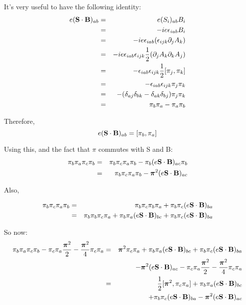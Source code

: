It's very useful to have the following identity:
\begin{eqnarray*}
	e(\mathbf{S} \cdot \mathbf{B})_{ab}
	&=&	e(S_i)_{ab} B_i	\\
	&=&	-i e \epsilon_{iab} B_i 	\\
	&=&	-i e \epsilon_{iab} (\epsilon_{ijk}\partial_j A_k)	\\
	&=&	-i e \epsilon_{iab} \epsilon_{ijk} \frac{1}{2} (\partial_j A_k \partial_k A_j) \\
	&=&	- \epsilon_{iab} \epsilon_{ijk} \frac{1}{2} [\pi_j, \pi_k]	\\
	&=&	-\epsilon_{iab} \epsilon_{ijk} \pi_j \pi_k	\\
	&=&	-(\delta_{aj} \delta_{bk}	- \delta_{ak} \delta_{bj} ) \pi_j \pi_k \\
	&=&	\pi_b \pi_a - \pi_a \pi_b	\\
\end{eqnarray*}

Therefore,
	$$ 	e(\mathbf{S} \cdot \mathbf{B})_{ab} = [\pi_b, \pi_a] $$



Using this, and the fact that $\pi$ commutes with S and B:
\begin{eqnarray*}
\pi_b \pi_a \pi_c \pi_b 
	&=&	\pi_b \pi_c \pi_a \pi_b 
				- \pi_b (e \mathbf{S} \cdot \mathbf{B})_{ac} \pi_b \\
	&=&	\pi_b \pi_c \pi_a \pi_b 
				-\mbox{\boldmath$ \pi $}^2 (e \mathbf{S} \cdot \mathbf{B})_{ac}	\\
\end{eqnarray*}

Also,

\begin{eqnarray*}
\pi_b \pi_c \pi_a \pi_b 
	&=&	\pi_b \pi_c \pi_b \pi_a 
				+ \pi_b \pi_c (e \mathbf{S} \cdot \mathbf{B})_{ba}	\\
	&=&	\pi_b \pi_b \pi_c \pi_a 
				+ \pi_b \pi_a (e \mathbf{S} \cdot \mathbf{B})_{bc}
				+ \pi_b \pi_c (e \mathbf{S} \cdot \mathbf{B})_{ba}	
\end{eqnarray*}

So now:
\begin{eqnarray*}
\pi_b \pi_a \pi_c \pi_b  
	- \pi_c \pi_a \frac{\mbox{\boldmath$ \pi $}^2}{2} 
	- \frac{\mbox{\boldmath$ \pi $}^2}{4} \pi_c \pi_a
	&=&	\mbox{\boldmath$ \pi $}^2 \pi_c \pi_a 
				+ \pi_b \pi_a (e \mathbf{S} \cdot \mathbf{B})_{bc}
				+ \pi_b \pi_c (e \mathbf{S} \cdot \mathbf{B})_{ba} \\
	&&			-\mbox{\boldmath$ \pi $}^2 (e \mathbf{S} \cdot \mathbf{B})_{ac}
				- \pi_c \pi_a \frac{\mbox{\boldmath$ \pi $}^2}{2} 
				- \frac{\mbox{\boldmath$ \pi $}^2}{4} \pi_c \pi_a	\\
	&=&	\frac{1}{2} [\mbox{\boldmath$ \pi $}^2, \pi_c \pi_a]
				+ \pi_b \pi_a (e \mathbf{S} \cdot \mathbf{B})_{bc}
	\\&&			+ \pi_b \pi_c (e \mathbf{S} \cdot \mathbf{B})_{ba}
				-\mbox{\boldmath$ \pi $}^2 (e \mathbf{S} \cdot \mathbf{B})_{ac} 
\end{eqnarray*}

